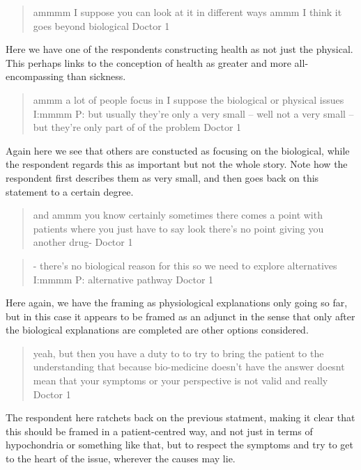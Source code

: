 \begin{quotation}
  ammmm I suppose you can look at it in different ways ammm I think it goes beyond biological 
Doctor 1
\end{quotation}

Here we have one of the respondents constructing health as not just the physical. This perhaps links to the conception of health as greater and more all-encompassing than sickness. 

\begin{quotation}
  ammm a lot of people focus in I suppose the biological or physical issues
I:mmmm
P: but usually they're only a very small – well not a very small – but they're only part of of the problem
Doctor 1
\end{quotation}

Again here we see that others are constucted as focusing on the biological, while the respondent regards this as important but not the whole story. Note how the respondent first describes them as very small, and then goes back on this statement to a certain degree. 


\begin{quotation}
and ammm you know certainly sometimes there comes a point with patients where you just have to say look there's no point giving you another drug-
Doctor 1  
\end{quotation}



\begin{quotation}
  - there's no biological reason for this so we need to explore alternatives 
I:mmmm
P: alternative pathway
Doctor 1
\end{quotation}

Here again, we have the framing as physiological explanations only going so far, but in this case it appears to be framed as an adjunct in the sense that only after the biological explanations are completed are other options considered. 

\begin{quotation}
  yeah, but then you have a duty to to try to bring the patient to the understanding that because bio-medicine doesn't have the answer doesnt mean that your symptoms or your perspective is not valid and really 
Doctor 1
\end{quotation}


The respondent here ratchets back on the previous statment, making it clear that this should be framed in a patient-centred way, and not just in terms of hypochondria or something like that, but to respect the symptoms and try to get to the heart of the issue, wherever the causes may lie. 

